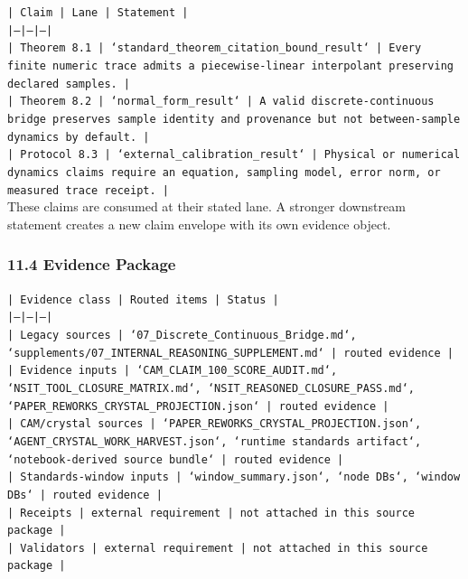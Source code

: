 \documentclass[11pt]{article}
\begin{document}
\noindent\texttt{| Claim | Lane | Statement |}\\
\noindent\texttt{|---|---|---|}\\
\noindent\texttt{| Theorem 8.1 | `standard\_theorem\_citation\_bound\_result` | Every finite numeric trace admits a piecewise-linear interpolant preserving declared samples. |}\\
\noindent\texttt{| Theorem 8.2 | `normal\_form\_result` | A valid discrete-continuous bridge preserves sample identity and provenance but not between-sample dynamics by default. |}\\
\noindent\texttt{| Protocol 8.3 | `external\_calibration\_result` | Physical or numerical dynamics claims require an equation, sampling model, error norm, or measured trace receipt. |}\\

These claims are consumed at their stated lane. A stronger downstream statement
creates a new claim envelope with its own evidence object.

\subsubsection*{11.4 Evidence Package}

\noindent\texttt{| Evidence class | Routed items | Status |}\\
\noindent\texttt{|---|---|---|}\\
\noindent\texttt{| Legacy sources | `07\_Discrete\_Continuous\_Bridge.md`, `supplements/07\_INTERNAL\_REASONING\_SUPPLEMENT.md` | routed evidence |}\\
\noindent\texttt{| Evidence inputs | `CAM\_CLAIM\_100\_SCORE\_AUDIT.md`, `NSIT\_TOOL\_CLOSURE\_MATRIX.md`, `NSIT\_REASONED\_CLOSURE\_PASS.md`, `PAPER\_REWORKS\_CRYSTAL\_PROJECTION.json` | routed evidence |}\\
\noindent\texttt{| CAM/crystal sources | `PAPER\_REWORKS\_CRYSTAL\_PROJECTION.json`, `AGENT\_CRYSTAL\_WORK\_HARVEST.json`, `runtime standards artifact`, `notebook-derived source bundle` | routed evidence |}\\
\noindent\texttt{| Standards-window inputs | `window\_summary.json`, `node DBs`, `window DBs` | routed evidence |}\\
\noindent\texttt{| Receipts | external requirement | not attached in this source package |}\\
\noindent\texttt{| Validators | external requirement | not attached in this source package |}\\
\end{document}
